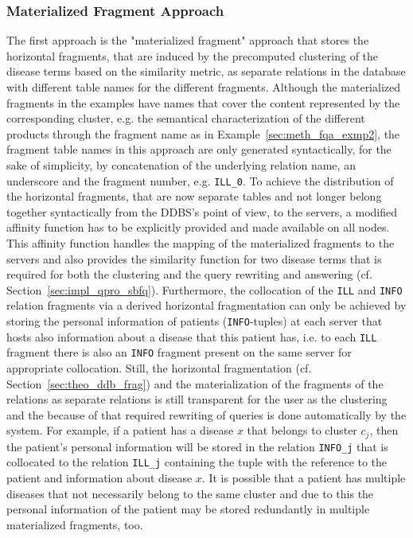 \subsubsection{Materialized Fragment Approach}
\label{sec:impl_alter_mater}
The first approach is the "materialized fragment" approach that stores the horizontal fragments, that are induced by the precomputed clustering of the disease
terms based on the similarity metric, as separate relations in the database with different table names for the different fragments. Although the materialized
fragments in the examples have names that cover the content represented by the corresponding cluster, e.g. the semantical characterization of the different
products through the fragment name as in Example~\ref{sec:meth_fqa_exmp2}, the fragment table names in this approach are only generated syntactically, for the
sake of simplicity, by concatenation of the underlying relation name, an underscore and the fragment number, e.g. \verb!ILL_0!. To achieve the distribution of
the horizontal fragments, that are now separate tables and not longer belong together syntactically from the DDBS's point of view, to the servers, a modified
affinity function has to be explicitly provided and made available on all nodes. This affinity function handles the mapping of the materialized fragments to 
the servers and also provides the similarity function for two disease terms that is required for both the clustering and the query rewriting and answering 
(cf. Section~\ref{sec:impl_qpro_sbfq}). Furthermore, the collocation of the \verb!ILL! and \verb!INFO! relation fragments via a derived horizontal 
fragmentation can only be achieved by storing the personal information of patients (\verb!INFO!-tuples) at each server that hosts also information about a
disease that this patient has, i.e. to each \verb!ILL! fragment there is also an \verb!INFO! fragment present on the same server for appropriate collocation.
Still, the horizontal fragmentation (cf. Section~\ref{sec:theo_ddb_frag}) and the materialization of the fragments of the relations as separate relations is 
still transparent for the user as the clustering and the because of that required rewriting of queries is done automatically by the system. For example, if a
patient has a disease $x$ that belongs to cluster $c_j$, then the patient's personal information will be stored in the relation \verb!INFO_j! that is collocated
to the relation \verb!ILL_j! containing the tuple with the reference to the patient and information about disease $x$. It is possible that a patient has multiple 
diseases that not necessarily belong to the same cluster and due to this the personal information of the patient may be stored redundantly in multiple 
materialized fragments, too.


